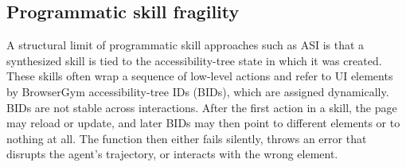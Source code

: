 \begin{table}[tb]
\centering
{}
\caption{\textbf{Any-of-3 and All-of-3 success rates (\%) on the Shopping domain of WebArena} across three models. Any-of-3 is the fraction of tasks succeeding in at least one run; All-of-3 is the fraction succeeding in all three runs. $\Delta_\uparrow$ and $\Delta_\downarrow$ are the gaps from the three-run mean (Table~\ref{tab:main}).}
\label{tab:any-all-3}
\end{table}

\subsection{Programmatic skill fragility}
\label{sec:fragility}

A structural limit of programmatic skill approaches such as ASI is that a synthesized skill is tied to the accessibility-tree state in which it was created.
These skills often wrap a sequence of low-level actions and refer to UI elements by BrowserGym accessibility-tree IDs (BIDs), which are assigned dynamically.
BIDs are not stable across interactions. After the first action in a skill, the page may reload or update, and later BIDs may then point to different elements or to nothing at all. The function then either fails silently, throws an error that disrupts the agent's trajectory, or interacts with the wrong element.

